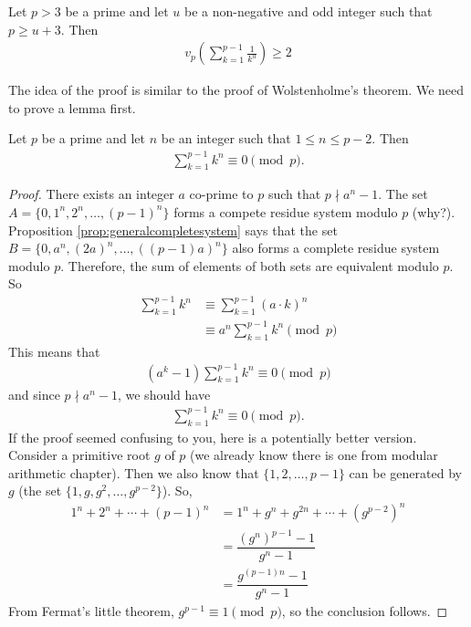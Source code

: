 \documentclass{subfile}
\begin{document}
	\begin{theorem}
		Let $p>3$ be a prime and let $u$ be a non-negative and odd integer such that $p \geq u+3$. Then
		\begin{align*}
		v_{p}\left(\sum_{k = 1}^{p - 1}\frac {1}{k^{u}}\right)\geq 2
		\end{align*}
	\end{theorem}

	The idea of the proof is similar to the proof of Wolstenholme's theorem. We need to prove a lemma first.

	\begin{lemma}\label{lem:darijwolstproof}
		Let $p$ be a prime and let $n$ be an integer such that $1 \leq n \leq p-2$. Then
		\begin{align*}
		\sum_{k = 1}^{p - 1} k^n \equiv 0 \pmod p.
		\end{align*}
	\end{lemma}

	\begin{proof}
		There exists an integer $a$ co-prime to $p$ such that $p \nmid a^n -1$. The set $A= \{0, 1^n, 2^n, \ldots, (p-1)^n\}$ forms a compete residue system modulo $p$ (why?). Proposition \eqref{prop:generalcompletesystem} says that the set $B=\{0, a^n, (2a)^n, \ldots, ((p-1)a)^n\}$ also forms a complete residue system modulo $p$. Therefore, the sum of elements of both sets are equivalent modulo $p$. So
		\begin{align*}
			\sum_{k = 1}^{p - 1} k^n
				& \equiv \sum_{k = 1}^{p - 1} (a \cdot k)^n\\
				& \equiv a^n \sum_{k = 1}^{p - 1} k^n \pmod p
		\end{align*}
		This means that
			\begin{align*}
				\left(a^k - 1\right) \sum_{k = 1}^{p - 1} k^n \equiv 0 \pmod p
			\end{align*}
		and since $p \nmid a^n -1$, we should have
			\begin{align*}
				\sum_{k = 1}^{p - 1} k^n \equiv 0 \pmod p.
			\end{align*}
		If the proof seemed confusing to you, here is a potentially better version. Consider a primitive root $g$ of $p$ (we already know there is one from modular arithmetic chapter). Then we also know that $\{1,2,\ldots,p-1\}$ can be generated by $g$ (the set $\{1,g,g^2,\ldots,g^{p-2}\}$). So,
			\begin{align*}
				1^n+2^n+\cdots+(p-1)^n & = 1^n+g^n+g^{2n}+\cdots+\left(g^{p-2}\right)^n\\
										&= \dfrac{(g^n)^{p-1}-1}{g^n-1}\\
										& = \dfrac{g^{(p-1)n}-1}{g^n-1}
			\end{align*}
		From Fermat's little theorem, $g^{p-1}\equiv1\pmod p$, so the conclusion follows.
	\end{proof}
\end{document}
